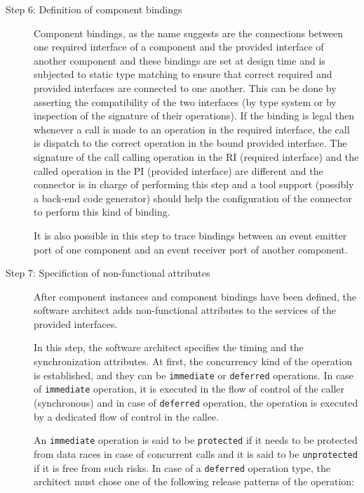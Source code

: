 \begin{description}
\item [Step 6: Definition of component bindings] Component bindings, as the name suggests are the connections between one required interface of a component and the provided interface of another component and these bindings are set at design time and is subjected to static type matching to ensure that correct required and provided interfaces are connected to one another. This can be done by asserting the compatibility of the two interfaces (by type system or by inspection of the signature of their operations). If the binding is legal then whenever a call is made to an operation in the required interface, the call is dispatch to the correct operation in the bound provided interface. The signature of the call calling operation in the RI (required interface) and the called operation in the PI (provided interface) are different and the connector is in charge of performing this step and a tool support (possibly a back-end code generator) should help the configuration of the connector to perform this kind of binding.

It is also possible in this step to trace bindings between an event emitter port of one component and an event receiver port of another component.

\item [Step 7: Specifiction of non-functional attributes] After component instances and component bindings have been defined, the software architect adds non-functional attributes to the services of the provided interfaces. 

In this step, the software architect specifies the timing and the synchronization attributes. At first, the concurrency kind of the operation is established, and they can be \texttt{immediate} or \texttt{deferred} operations. In case of \texttt{immediate} operation, it is executed in the flow of control of the caller (synchronous) and in case of \texttt{deferred} operation, the operation is executed by a dedicated flow of control in the callee. 

An \texttt{immediate} operation is said to be \texttt{protected} if it needs to be protected from data races in case of concurrent calls and it is said to be \texttt{unprotected} if it is free from such risks. In case of a \texttt{deferred} operation type, the architect must chose one of the following release patterns of the operation:


\end{description}

